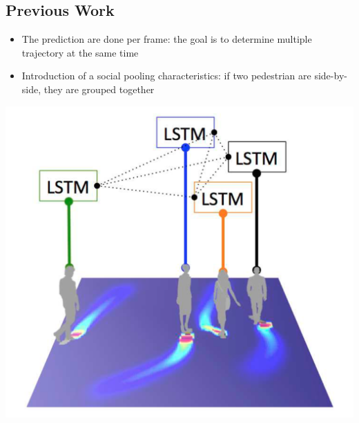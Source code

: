 \documentclass[a0,portrait]{a0poster}
\begin{document}
\begin{multicols}{2}
\section*{Previous Work \cite{Alahi}}
\begin{minipage}[]{0.6\linewidth}
\begin{itemize}
\justifying
\item The prediction are done per frame: the goal is to determine multiple trajectory at the same time
\item Introduction of a social pooling characteristics: if two pedestrian are side-by-side, they are grouped together
\end{itemize}
\end{minipage}
\hfill
\begin{minipage}[]{0.4\linewidth}
\centerline {\includegraphics[scale = 0.35]{figure/socialLSTM}}
\end{minipage}
%

\end{multicols}
\end{document}
